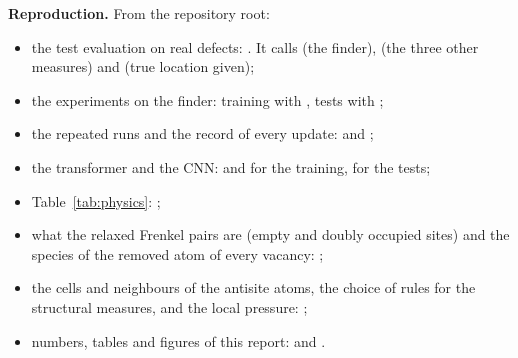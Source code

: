 \documentclass[10pt]{article}
\begin{document}
\textbf{Reproduction.} From the repository root:
\begin{itemize}\raggedright
\item the test evaluation on real defects: . It calls  (the finder),  (the three other measures) and  (true location given);
\item the experiments on the finder: training with , tests with ;
\item the repeated runs and the record of every update:  and ;
\item the transformer and the CNN:  and  for the training,  for the tests;
\item Table~\ref{tab:physics}: ;
\item what the relaxed Frenkel pairs are (empty and doubly occupied sites) and the species of the removed atom of every vacancy: ;
\item the cells and neighbours of the antisite atoms, the choice of rules for the structural measures, and the local pressure: ;
\item numbers, tables and figures of this report:  and .
\end{itemize}
\end{document}
